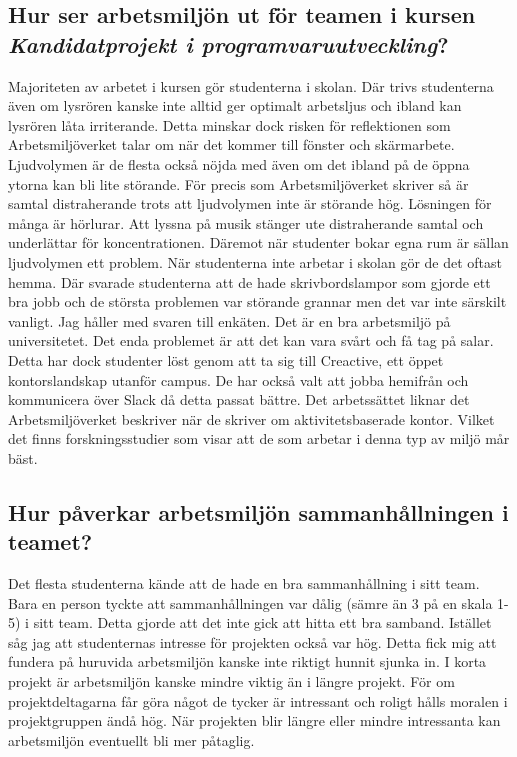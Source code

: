 \subsection{Hur ser arbetsmiljön ut för teamen i kursen \textit{Kandidatprojekt i programvaruutveckling}?}
Majoriteten av arbetet i kursen gör studenterna i skolan. Där trivs studenterna även om lysrören kanske inte alltid ger optimalt arbetsljus och ibland kan lysrören låta irriterande. Detta minskar dock risken för reflektionen som Arbetsmiljöverket talar om när det kommer till fönster och skärmarbete. Ljudvolymen är de flesta också nöjda med även om det ibland på de öppna ytorna kan bli lite störande. För precis som Arbetsmiljöverket skriver så är samtal distraherande trots att ljudvolymen inte är störande hög. Lösningen för många är hörlurar. Att lyssna på musik stänger ute distraherande samtal och underlättar för koncentrationen. Däremot när studenter bokar egna rum är sällan ljudvolymen ett problem. När studenterna inte arbetar i skolan gör de det oftast hemma. Där svarade studenterna att de hade skrivbordslampor som gjorde ett bra jobb och de största problemen var störande grannar men det var inte särskilt vanligt. Jag håller med svaren till enkäten. Det är en bra arbetsmiljö på universitetet. Det enda problemet är att det kan vara svårt och få tag på salar. Detta har dock studenter löst genom att ta sig till Creactive, ett öppet kontorslandskap utanför campus. De har också valt att jobba hemifrån och kommunicera över Slack då detta passat bättre. Det arbetssättet liknar det Arbetsmiljöverket beskriver när de skriver om aktivitetsbaserade kontor. Vilket det finns forskningsstudier som visar att de som arbetar i denna typ av miljö mår bäst.

\subsection{Hur påverkar arbetsmiljön sammanhållningen i teamet?}
Det flesta studenterna kände att de hade en bra sammanhållning i sitt team. Bara en person tyckte att sammanhållningen var dålig (sämre än 3 på en skala 1-5) i sitt team. Detta gjorde att det inte gick att hitta ett bra samband. Istället såg jag att studenternas intresse för projekten också var hög. Detta fick mig att fundera på huruvida arbetsmiljön kanske inte riktigt hunnit sjunka in. I korta projekt är arbetsmiljön kanske mindre viktig än i längre projekt. För om projektdeltagarna får göra något de tycker är intressant och roligt hålls moralen i projektgruppen ändå hög. När projekten blir längre eller mindre intressanta kan arbetsmiljön eventuellt bli mer påtaglig.

